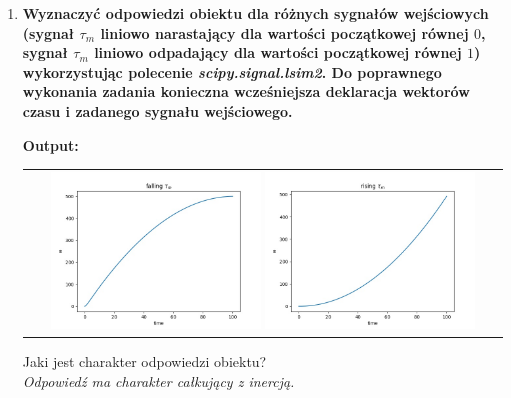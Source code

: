 \documentclass[12pt]{article}
\begin{document}
\begin{enumerate}
        \item\textbf{Wyznaczyć odpowiedzi obiektu dla różnych sygnałów wejściowych (sygnał $\tau_m$ liniowo
        narastający dla wartości początkowej równej $0$, sygnał $\tau_m$ liniowo odpadający dla wartości
        początkowej równej $1$) wykorzystując polecenie \emph{scipy.signal.lsim2}. Do poprawnego
        wykonania zadania konieczna wcześniejsza deklaracja wektorów czasu i zadanego sygnału
        wejściowego.}
            \begin{shbox}
                \centering
                \textbf{Output:} \\
                \begin{tabular}{c}
                    \includegraphics[width=0.45\textwidth]{lab2/zad4_3_falling.jpg}
                    \includegraphics[width=0.45\textwidth]{lab2/zad4_3_rising.jpg}
                \end{tabular}
            \end{shbox}
            Jaki jest charakter odpowiedzi obiektu?\\
            \emph{Odpowiedź ma charakter całkujący z inercją.}


\end{enumerate}
\end{document}
